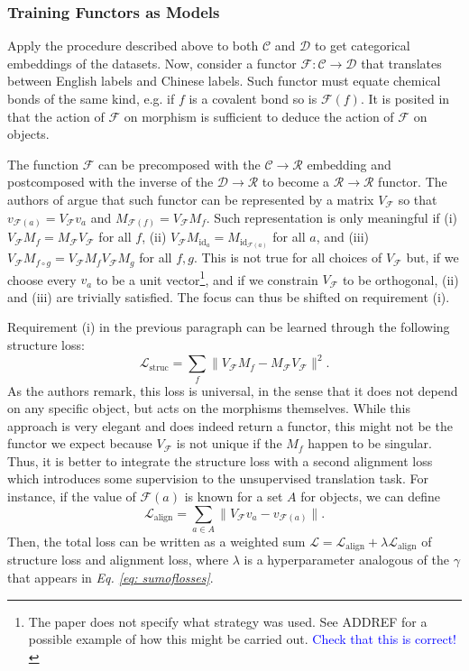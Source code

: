 \documentclass[11pt,a4paper,openright,twoside]{report}
\theoremstyle{plain}
\theoremstyle{definition}
\begin{document}
\subsubsection{Training Functors as Models}

Apply the procedure described above to both $\mathcal{C}$ and $\mathcal{D}$ to get categorical embeddings of the datasets. Now, consider a functor $\mathcal{F}: \mathcal{C} \to \mathcal{D}$ that translates between English labels and Chinese labels. Such functor must equate chemical bonds of the same kind, e.g. if $f$ is a covalent bond so is $\mathcal{F}(f)$. It is posited in \cite{sheshmaniCategoricalRepresentationLearning2022} that the action of $\mathcal{F}$ on morphism is sufficient to deduce the action of $\mathcal{F}$ on objects.


The function $\mathcal{F}$ can be precomposed with the $\mathcal{C} \to \mathcal{R}$ embedding and postcomposed with the inverse of the $\mathcal{D} \to \mathcal{R}$ to become a $\mathcal{R} \to \mathcal{R}$ functor. The authors of \cite{sheshmaniCategoricalRepresentationLearning2022} argue that such functor can be represented by a matrix $V_\mathcal{F}$ so that $v_{\mathcal{F}(a)} =  V_\mathcal{F}v_a$ and $M_{\mathcal{F}(f)} = V_\mathcal{F}M_f$. Such representation is only meaningful if (i) $V_{\mathcal{F}}M_f = M_{\mathcal{F}}V_{\mathcal{F}}$ for all $f$, (ii) $V_{\mathcal{F}}M_{\mathrm{id}_a} = M_{\mathrm{id}_{\mathcal{F}(a)}}$ for all $a$, and (iii) $V_{\mathcal{F}}M_{f \circ g} = V_{\mathcal{F}}M_fV_{\mathcal{F}}M_g$ for all $f,g$. This is not true for all choices of  $V_\mathcal{F}$ but, if we choose every $v_a$ to be a unit vector\footnote{The paper does not specify what strategy was used. See ADDREF for a possible example of how this might be carried out. \textcolor{blue}{Check that this is correct!}}, and if we constrain $V_{\mathcal{F}}$ to be orthogonal, (ii) and (iii) are trivially satisfied. The focus can thus be shifted on requirement (i).


Requirement (i) in the previous paragraph can be learned through the following structure loss:
\[\mathcal{L}_{\mathrm{struc}} = \sum_{f}\|V_{\mathcal{F}}M_f - M_{\mathcal{F}}V_{\mathcal{F}}\|^2.\]
As the authors remark, this loss is universal, in the sense that it does not depend on any specific object, but acts on the morphisms themselves. While this approach is very elegant and does indeed return a functor, this might not be the functor we expect because $V_{\mathcal{F}}$ is not unique if the $M_f$ happen to be singular. Thus, it is better to integrate the structure loss with a second alignment loss which introduces some supervision to the unsupervised translation task. For instance, if the value of $\mathcal{F}(a)$ is known for a set $A$ for objects, we can define
\[\mathcal{L}_{\mathrm{align}} = \sum_{a \in A}\|V_{\mathcal{F}}v_a - v_{\mathcal{F}(a)}\|.\]
Then, the total loss can be written as a weighted sum $\mathcal{L} = \mathcal{L}_{\mathrm{align}} + \lambda \mathcal{L}_{\mathrm{align}}$ of structure loss and alignment loss, where $\lambda$ is a hyperparameter analogous of the $\gamma$ that appears in \textit{Eq. \ref{eq: sumoflosses}}.
\end{document}
